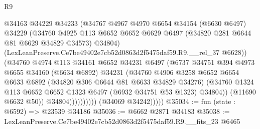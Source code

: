 \begin{lexlean}{R9}
\begin{coremodule}
                              @34163
                              @34229
                              @34233
                              (@34767
                                @4967
                                @4970
                                @6654
                                @34154
                                (@6630 @6497)
                                @34229
                                (@34760
                                  @4925
                                  @113
                                  @6652
                                  @6652
                                  @6629
                                  @6497
                                  (@34820 @281 @6644 @81 @6629 @34829 @34573)
                                  @34804)
                                (LexLeanPreserve.Ce7be49402e7cb52d0863d2f5475daf59.R9.__rel_37
                                  @6628))
                              (@34760
                                @4974
                                @113
                                @34161
                                @6652
                                @34231
                                @6497
                                (@6737
                                  @34751
                                  @394
                                  @4973
                                  @6655
                                  @34160
                                  (@6634 @6892)
                                  @34231
                                  (@34760
                                    @4906
                                    @3258
                                    @6652
                                    @6654
                                    @6633
                                    @6892
                                    (@34820 @306 @6644 @81 @6633 @34829 @34276)
                                    (@34760
                                      @1324
                                      @113
                                      @6652
                                      @6652
                                      @1323
                                      @6497
                                      (@6932 @34751 @53 @1323)
                                      @34804))
                                  (@11690 @6632 @50))
                                @34804))))))))))
            (@34069 @34242)))))
@35034 := fun (state : @6592) => @23539 @34186
@35036 := @6662 @2871 @34183
@35038 := LexLeanPreserve.Ce7be49402e7cb52d0863d2f5475daf59.R9.__fits_23 @6465

\end{coremodule}
\end{lexlean}
